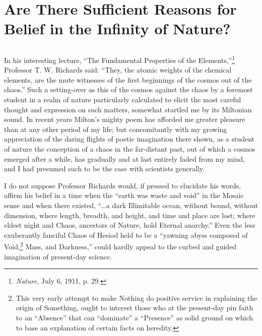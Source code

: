 \documentclass[a4paper, 11pt, oneside, polutonikogreek, english, landscape]{article}
\begin{document}
\section{Are There Sufficient Reasons for Belief in the Infinity of Nature?}
\subsection{}
\paragraph{}
In his interesting lecture, ``The Fundamental Properties of the Elements,''\footnote{\emph{Nature}, July 6, 1911, p. 29.} Professor T. W. Richards said: ``They, the atomic weights of the chemical elements, are the mute witnesses of the first beginnings of the cosmos out of the chaos.'' Such a setting-over as this of the cosmos against the chaos by a foremost student in a realm of nature particularly calculated to elicit the most careful thought and expression on such matters, somewhat startled me by its Miltonian sound. In recent years Milton's mighty poem has afforded me greater pleasure than at any other period of my life; but concomitantly with my growing appreciation of the daring flights of poetic imagination there shown, as a student of nature the conception of a chaos in the far-distant past, out of which a cosmos emerged after a while, has gradually and at last entirely faded from my mind, and I had presumed such to be the case with scientists generally.

I do not suppose Professor Richards would, if pressed to elucidate his words, affirm his belief in a time when the ``earth was waste and void'' in the Mosaic sense and when there existed, ``...a dark Illimitable ocean, without bound, without dimension, where length, breadth, and height, and time and place are lost; where eldest night and Chaos, ancestors of Nature, hold Eternal anarchy.'' Even the less exuberantly fanciful Chaos of Hesiod held to be a ``yawning abyss composed of Void,\footnote{This very early attempt to make Nothing do positive service in explaining the origin of Something, ought to interest those who at the present-day pin faith to an ``Absence'' that can ``dominate'' a ``Presence'' as solid ground on which to base an explanation of certain facts on heredity.} Mass, and Darkness,'' could hardly appeal to the curbed and guided imagination of present-day science.
\end{document}
